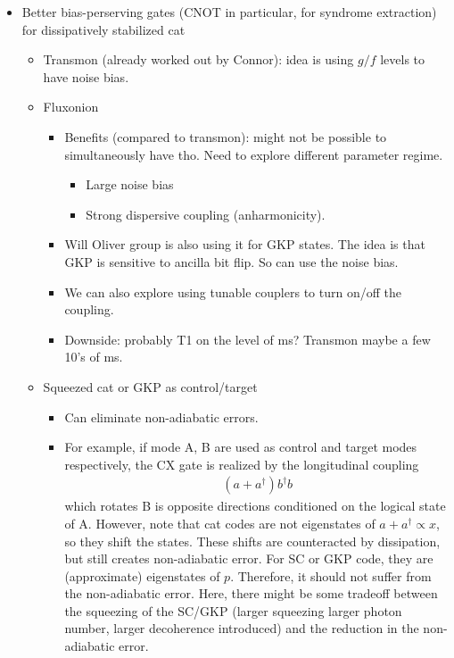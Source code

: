 \documentclass[a4paper,11pt]{article}
\begin{document}
\begin{itemize}
    \item Better bias-perserving gates (CNOT in particular, for syndrome extraction) for dissipatively stabilized cat 
    \begin{itemize}
        \item Transmon (already worked out by Connor): idea is using $g/f$ levels to have noise bias. 
        \item Fluxonion
        \begin{itemize}
            \item Benefits (compared to transmon): might not be possible to simultaneously have tho. Need to explore different parameter regime.
            \begin{itemize}
                \item Large noise bias 
                \item Strong dispersive coupling (anharmonicity).
            \end{itemize}
            \item Will Oliver group is also using it for GKP states. The idea is that GKP is sensitive to ancilla bit flip. So can use the noise bias.
            \item We can also explore using tunable couplers to turn on/off the coupling.
            \item Downside: probably T1 on the level of ms? Transmon maybe a few 10's of ms. 
        \end{itemize}
        \item Squeezed cat or GKP as control/target
        \begin{itemize}
            \item Can eliminate non-adiabatic errors. 
            \item For example, if mode A, B are used as control and target modes respectively, the CX gate is realized by the longitudinal coupling 
            \begin{eqnarray}
                    (a +a^\dagger)b^\dagger b
            \end{eqnarray}
            which rotates B is opposite directions conditioned on the logical state of A. However, note that cat codes are not eigenstates of $a+a^\dagger \propto x$, so they shift the states. These shifts are counteracted by dissipation, but still creates non-adiabatic error. For SC or GKP code, they are (approximate) eigenstates of $p$. Therefore, it should not suffer from the non-adiabatic error. Here, there might be some tradeoff between the squeezing of the SC/GKP (larger squeezing larger photon number, larger decoherence introduced) and the reduction in the non-adiabatic error.

\end{itemize}
\end{itemize}
\end{itemize}
\end{document}

